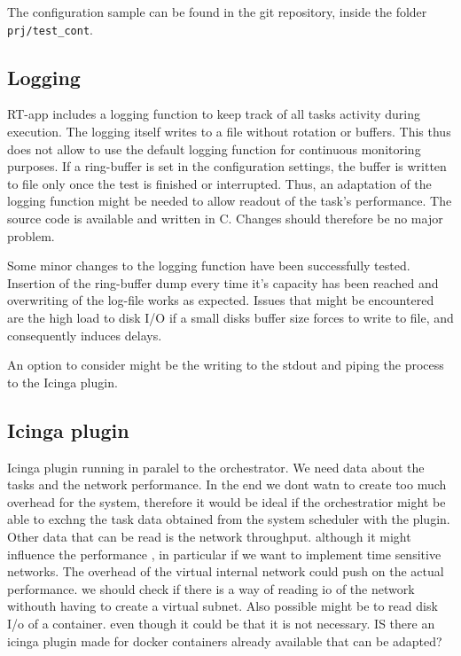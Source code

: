 \documentclass[]{scrartcl}
\begin{document}
The configuration sample can be found in the git repository, inside the folder \texttt{prj/test\_cont}.

\subsection{Logging}

RT-app includes a logging function to keep track of all tasks activity during execution. The logging itself writes to a file without rotation or buffers.
This thus does not allow to use the default logging function for continuous monitoring purposes.
If a ring-buffer is set in the configuration settings, the buffer is written to file only once the test is finished or interrupted. 
Thus, an adaptation of the logging function might be needed to allow readout of the task's performance.
The source code is available and written in C. Changes should therefore be no major problem.

Some minor changes to the logging function have been successfully tested. Insertion of the ring-buffer dump every time it's capacity has been reached and overwriting of the log-file works as expected.
Issues that might be encountered are the high load to disk I/O if a small disks buffer size forces to write to file, and consequently induces delays.

An option to consider might be the writing to the stdout and piping the process to the Icinga plugin. 


\subsection{Icinga plugin}

Icinga plugin running in paralel to the orchestrator. We need data about the tasks and the network performance. In the end we dont watn to create too much overhead for the system, therefore it would be ideal if the orchestratior might be able to exchng the task data obtained from the system scheduler with the plugin.
Other data that can be read is the network throughput. although it might influence the performance , in particular if we want to implement time sensitive networks.
The overhead of the virtual internal network could push on the actual performance. we should check if there is a way of reading io of the network withouth having to create a virtual subnet.
Also possible might be to read disk I/o of a container. even though it could be that it is not necessary. 
IS there an icinga plugin made for docker containers already available that can be adapted?
\end{document}
